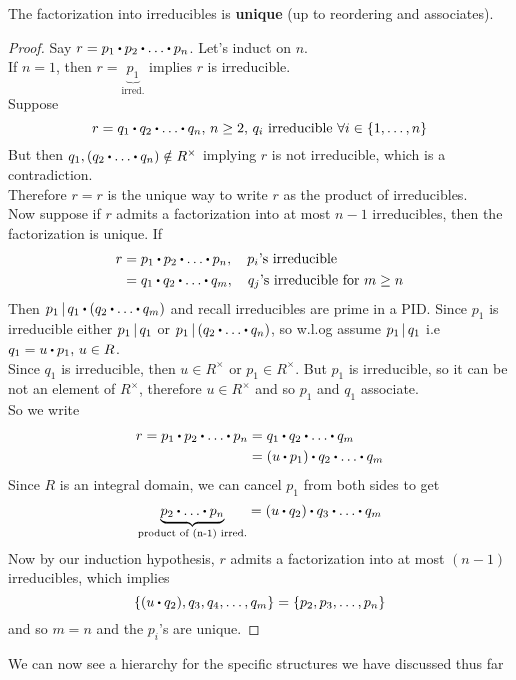 \documentclass[../Main.tex]{subfiles}
\begin{document}
\begin{lem}
	The factorization into irreducibles is \textbf{unique} (up to reordering and associates).
\end{lem}
\begin{proof}
	Say $r=p_1\rdot p_2\rdot \dots\rdot p_n$. Let's induct on $n$.\\
	If $n=1$, then $r=\underbrace{p_1}_{\text{irred.}}$ implies $r$ is irreducible.\\
	Suppose
	\[r=q_1\rdot q_2\rdot \dots\rdot q_n,\, n\ge 2,\, q_i \text{ irreducible } \forall i\in \{1,\dots,n\}\]
	But then $q_1,(q_2\rdot \dots\rdot  q_n) \notin R^\times$ implying $r$ is not irreducible, which is a contradiction.\\
	Therefore $r=r$ is the unique way to write $r$ as the product of irreducibles.\\
	Now suppose if $r$ admits a factorization into at most $n-1$ irreducibles, then the factorization is unique.
	If
	\begin{align*}
	r&=p_1\rdot p_2\rdot \dots \rdot p_n, \quad p_i\text{'s irreducible}\\
	&=q_1\rdot q_2\rdot \dots\rdot q_m,\quad q_j\text{'s irreducible for } m\ge n
	\end{align*}
	Then $\divs{p_1}{q_1 \rdot (q_2\rdot \dots\rdot  q_m)}$ and recall irreducibles are prime in a PID. Since $p_1$ is irreducible either $p_1 \, | \, q_1$ or $\divs{p_1}{(q_2\rdot \dots\rdot  q_n)}$, so w.l.og assume $p_1 \, | \, q_1$ i.e $q_1=u\rdot p_1,\, u\in R$.\\
	Since $q_1$ is irreducible, then $u\in R^\times $ or $p_1 \in R^\times$. But $p_1$ is irreducible, so it can be not an element of $R^\times$, therefore $u\in R^\times$ and so $p_1$ and $q_1$ associate.\\
	So we write
	\begin{align*}r=p_1\rdot p_2\rdot \dots \rdot p_n&= q_1\rdot q_2 \rdot  \dots \rdot q_m\\
	&=(u\rdot p_1)\rdot q_2\rdot \dots \rdot q_m \end{align*}
	Since $R$ is an integral domain, we can cancel $p_1$ from both sides to get
	\[\underbrace{p_2\rdot \dots \rdot p_n}_{\text{product of (n-1) irred.}} =(u\rdot q_2)\rdot q_3\rdot \dots \rdot q_m \]
	Now by our induction hypothesis, $r$ admits a factorization into at most $(n-1)$ irreducibles, which implies
	\[\{(u\rdot q_2),q_3,q_4,\dots,q_m\}=\{p_2,p_3,\dots,p_n\}\]
	and so $m=n$ and the $p_i$'s are unique.
\end{proof}
We can now see a hierarchy for the specific structures we have discussed thus far
\end{document}
